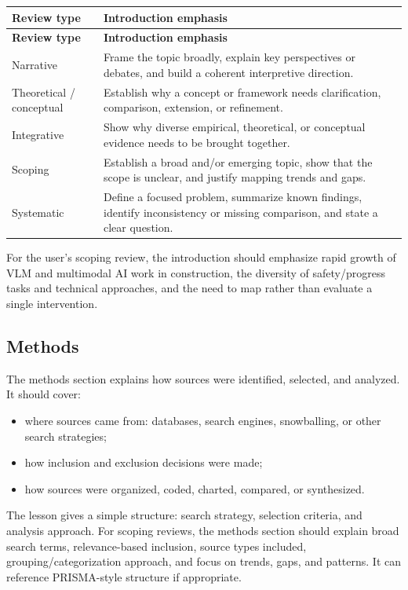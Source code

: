 \documentclass[10pt,letterpaper]{article}
\begin{document}
\begin{longtable}{L{3.6cm} L{9.9cm}}
\toprule
{}
\textbf{Review type} & \textbf{Introduction emphasis}\\
\midrule
\endfirsthead
\toprule
{}
\textbf{Review type} & \textbf{Introduction emphasis}\\
\midrule
\endhead
\bottomrule
\endfoot
Narrative & Frame the topic broadly, explain key perspectives or debates, and build a coherent interpretive direction.\\
Theoretical / conceptual & Establish why a concept or framework needs clarification, comparison, extension, or refinement.\\
Integrative & Show why diverse empirical, theoretical, or conceptual evidence needs to be brought together.\\
Scoping & Establish a broad and/or emerging topic, show that the scope is unclear, and justify mapping trends and gaps.\\
Systematic & Define a focused problem, summarize known findings, identify inconsistency or missing comparison, and state a clear question.\\
\end{longtable}

For the user's scoping review, the introduction should emphasize rapid growth of VLM and multimodal AI work in construction, the diversity of safety/progress tasks and technical approaches, and the need to map rather than evaluate a single intervention.

\subsection{Methods}

The methods section explains how sources were identified, selected, and analyzed. It should cover:

\begin{itemize}
\item where sources came from: databases, search engines, snowballing, or other search strategies;
\item how inclusion and exclusion decisions were made;
\item how sources were organized, coded, charted, compared, or synthesized.
\end{itemize}

The lesson gives a simple structure: search strategy, selection criteria, and analysis approach. For scoping reviews, the methods section should explain broad search terms, relevance-based inclusion, source types included, grouping/categorization approach, and focus on trends, gaps, and patterns. It can reference PRISMA-style structure if appropriate.
\end{document}
